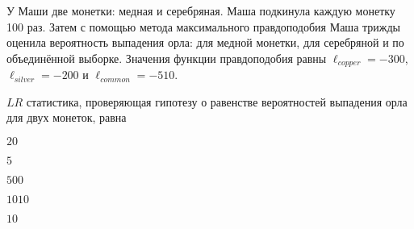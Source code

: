 
\begin{question}
У Маши две монетки: медная и серебряная. Маша подкинула каждую монетку
100 раз. Затем с помощью метода максимального правдоподобия Маша трижды
оценила вероятность выпадения орла: для медной монетки, для серебряной и
по объединённой выборке. Значения функции правдоподобия равны
\(\ell_{copper} = -300\), \(\ell_{silver}=-200\) и
\(\ell_{common} = -510\).

\(LR\) статистика, проверяющая гипотезу о равенстве вероятностей
выпадения орла для двух монеток, равна
\begin{answerlist}
  \item \(20\)
  \item \(5\)
  \item \(500\)
  \item \(1010\)
  \item \(10\)
\end{answerlist}
\end{question}


